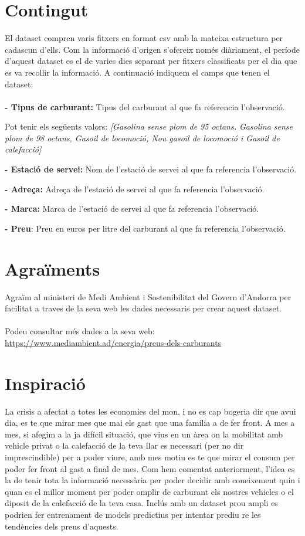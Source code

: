 \documentclass[10pt,a4paper]{article}
\begin{document}
\section{Contingut}
El dataset compren varis fitxers en format csv amb la mateixa estructura per cadascun d'ells. Com la informació d'origen s'ofereix només diàriament, el període d'aquest dataset es el de varies dies separant per fitxers classificats per el dia que es va recollir la informació. A continuació indiquem el camps que tenen el dataset:

\paragraph*{}
\textbf{- Tipus de carburant:} Tipus del carburant al que fa referencia l'observació.

Pot tenir els següents valors: \textit{[Gasolina sense plom de 95 octans, Gasolina sense plom de 98 octans, Gasoil de locomoció, Nou gasoil de locomoció i Gasoil de calefacció]}

\textbf{- Estació de servei:} Nom de l'estació de servei al que fa referencia l'observació.

\textbf{- Adreça:} Adreça de l'estació de servei al que fa referencia l'observació.

\textbf{- Marca:} Marca de l'estació de servei al que fa referencia l'observació.

\textbf{- Preu}: Preu en euros per litre del carburant al que fa referencia l'observació.

\section{Agraïments}
Agraïm al ministeri de Medi Ambient i Sostenibilitat del Govern d'Andorra per facilitat a traves de la seva web les dades necessaris per crear aquest dataset.
\paragraph*{}
Podeu consultar més dades a la seva web: \href{https://www.mediambient.ad/energia/preus-dels-carburants}{https://www.mediambient.ad/energia/preus-dels-carburants}

\section{Inspiració}
La crisis a afectat a totes les economies del mon, i no es cap bogeria dir que avui dia, es te que mirar mes que mai els gast que una família a de fer front. A mes a mes, si afegim a la ja difícil situació, que vius en un àrea on la mobilitat amb vehicle privat o la calefacció de la teva llar es necessari (per no dir imprescindible) per a poder viure, amb mes motiu es te que mirar el consum per poder fer front al gast a final de mes. Com hem comentat anteriorment, l'idea es la de tenir tota la informació necessària per poder decidir amb coneixement quin i quan es el millor moment per poder omplir de carburant els nostres vehicles o el diposit de la calefacció de la teva casa. Inclús amb un dataset prou ampli es podrien fer entrenament de models predictius per intentar prediu re les tendències dels preus d'aquests.
\end{document}
